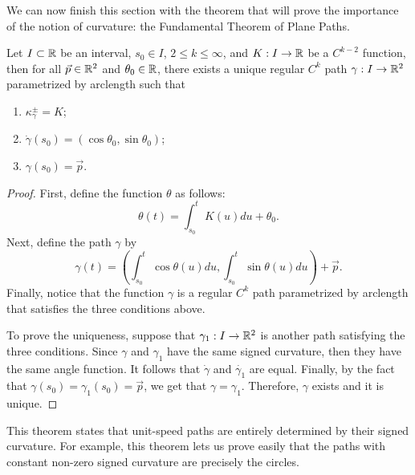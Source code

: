 We can now finish this section with the theorem that will prove the importance of the notion of curvature: the Fundamental Theorem of Plane Paths.

\begin{theorem}
    Let $I \subset \mathbb{R}$ be an interval, $s_0 \in I$, $2 \leq k \leq \infty$, and $K : I \to \mathbb{R}$ be a $C^{k-2}$ function, then for all $\vec{p} \in \mathbb{R}^2$ and $\theta_0 \in \mathbb{R}$, there exists a unique regular $C^k$ path $\gamma : I \to \mathbb{R}^2$ parametrized by arclength such that
    \begin{enumerate}
        \item $\kappa_{\gamma}^{\pm} = K$;
        \item $\dot{\gamma}(s_0) = (\cos \theta_0, \sin \theta_0)$;
        \item $\gamma(s_0) = \vec{p}$.
    \end{enumerate}
\end{theorem}

\begin{proof}
    First, define the function $\theta$ as follows:
    $$\theta(t) = \int_{s_0}^{t}K(u)du + \theta_0.$$
    Next, define the path $\gamma$ by
    $$\gamma(t) = \left(\int_{s_0}^{t}\cos \theta(u)du, \int_{s_0}^{t}\sin \theta(u)du\right) + \vec{p}.$$
    Finally, notice that the function $\gamma$ is a regular $C^k$ path parametrized by arclength that satisfies the three conditions above. 

    To prove the uniqueness, suppose that $\gamma_1 : I \to \mathbb{R}^2$ is another path satisfying the three conditions. Since $\gamma$ and $\gamma_1$ have the same signed curvature, then they have the same angle function. It follows that $\dot{\gamma}$ and $\dot{\gamma_1}$ are equal. Finally, by the fact that $\gamma(s_0) = \gamma_1(s_0) = \vec{p}$, we get that $\gamma = \gamma_1$. Therefore, $\gamma$ exists and it is unique.
\end{proof}

This theorem states that unit-speed paths are entirely determined by their signed curvature. For example, this theorem lets us prove easily that the paths with constant non-zero signed curvature are precisely the circles.